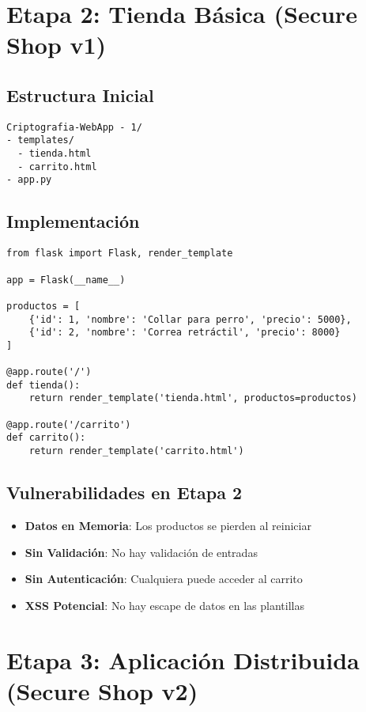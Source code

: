 \section{Etapa 2: Tienda Básica (Secure Shop v1)}

\subsection{Estructura Inicial}
\begin{lstlisting}
Criptografia-WebApp - 1/
- templates/
  - tienda.html
  - carrito.html
- app.py
\end{lstlisting}

\subsection{Implementación}
\begin{verbatim}
from flask import Flask, render_template

app = Flask(__name__)

productos = [
    {'id': 1, 'nombre': 'Collar para perro', 'precio': 5000},
    {'id': 2, 'nombre': 'Correa retráctil', 'precio': 8000}
]

@app.route('/')
def tienda():
    return render_template('tienda.html', productos=productos)

@app.route('/carrito')
def carrito():
    return render_template('carrito.html')
\end{verbatim}

\subsection{Vulnerabilidades en Etapa 2}
\begin{itemize}
    \item \textbf{Datos en Memoria}: Los productos se pierden al reiniciar
    \item \textbf{Sin Validación}: No hay validación de entradas
    \item \textbf{Sin Autenticación}: Cualquiera puede acceder al carrito
    \item \textbf{XSS Potencial}: No hay escape de datos en las plantillas
\end{itemize}

\section{Etapa 3: Aplicación Distribuida (Secure Shop v2)}

